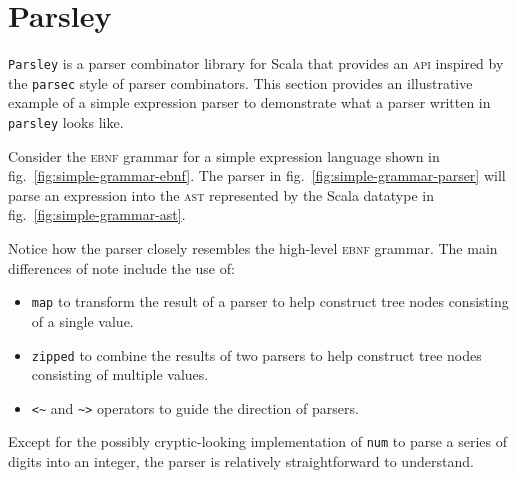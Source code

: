 \section{Parsley}

\texttt{Parsley} \cite{willis_garnishing_2018} is a parser combinator library for Scala that provides an \textsc{api} inspired by the \texttt{parsec} \cite{leijen_parsec_2001} style of parser combinators.
This section provides an illustrative example of a simple expression parser to demonstrate what a parser written in \texttt{parsley} looks like.

Consider the \textsc{ebnf} grammar for a simple expression language shown in fig.~\ref{fig:simple-grammar-ebnf}.
The parser in fig.~\ref{fig:simple-grammar-parser} will parse an expression into the \textsc{ast} represented by the Scala datatype in fig.~\ref{fig:simple-grammar-ast}.

Notice how the parser closely resembles the high-level \textsc{ebnf} grammar.
The main differences of note include the use of:
\begin{itemize}
  \item \texttt{map} to transform the result of a parser to help construct tree nodes consisting of a single value.
  \item \texttt{zipped} to combine the results of two parsers to help construct tree nodes consisting of multiple values.
  \item \texttt{<\textasciitilde} and \texttt{\textasciitilde>} operators to guide the direction of parsers.
\end{itemize}
Except for the possibly cryptic-looking implementation of \texttt{num} to parse a series of digits into an integer, the parser is relatively straightforward to understand.

